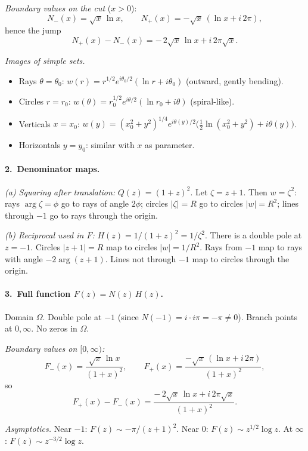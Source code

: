 \documentclass[12pt,a4paper]{article}
\begin{document}
\emph{Boundary values on the cut} (\(x>0\)):
\[
N_-(x)=\sqrt{x}\,\ln x,\qquad
N_+(x)=-\sqrt{x}\,(\ln x+i\,2\pi),
\]
hence the jump
\[
N_+(x)-N_-(x)=-\,2\sqrt{x}\,\ln x+i\,2\pi\sqrt{x}.
\]

\emph{Images of simple sets.}
\begin{itemize}
\item Rays \(\theta=\theta_0\): \(w(r)=r^{1/2}e^{i\theta_0/2}(\ln r+i\theta_0)\) (outward, gently bending).
\item Circles \(r=r_0\): \(w(\theta)=r_0^{1/2}e^{i\theta/2}(\ln r_0+i\theta)\) (spiral-like).
\item Verticals \(x=x_0\): \(w(y)=(x_0^2+y^2)^{1/4}e^{i\theta(y)/2}\big(\tfrac12\ln(x_0^2+y^2)+i\theta(y)\big)\).
\item Horizontals \(y=y_0\): similar with \(x\) as parameter.
\end{itemize}

\bigskip
\paragraph{2.\ Denominator maps.}
\emph{(a) Squaring after translation: } \(Q(z)=(1+z)^2\).
Let \(\zeta=z+1\). Then \(w=\zeta^2\):
rays \(\arg\zeta=\phi\) go to rays of angle \(2\phi\);
circles \(|\zeta|=R\) go to circles \(|w|=R^2\);
lines through \(-1\) go to rays through the origin.

\emph{(b) Reciprocal used in \(F\): } \(H(z)=1/(1+z)^2=1/\zeta^2\).
There is a double pole at \(z=-1\).
Circles \(|z+1|=R\) map to circles \(|w|=1/R^2\).
Rays from \(-1\) map to rays with angle \(-2\arg(z+1)\).
Lines not through \(-1\) map to circles through the origin.

\bigskip
\paragraph{3.\ Full function \(F(z)=N(z)\,H(z)\).}
Domain \(\Omega\).
Double pole at \(-1\) (since \(N(-1)=i\cdot i\pi=-\pi\neq0\)).
Branch points at \(0,\infty\).
No zeros in \(\Omega\).

\emph{Boundary values on \([0,\infty)\):}
\[
F_-(x)=\frac{\sqrt{x}\,\ln x}{(1+x)^2},\qquad
F_+(x)=\frac{-\sqrt{x}\,(\ln x+i\,2\pi)}{(1+x)^2},
\]
so
\[
F_+(x)-F_-(x)=\frac{-\,2\sqrt{x}\,\ln x+i\,2\pi\sqrt{x}}{(1+x)^2}.
\]

\emph{Asymptotics.}
Near \(-1\): \(F(z)\sim -\pi/(z+1)^2\).
Near \(0\): \(F(z)\sim z^{1/2}\log z\).
At \(\infty\): \(F(z)\sim z^{-3/2}\log z\).
\end{document}
